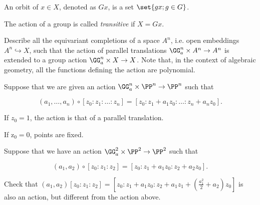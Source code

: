 \documentclass[11pt]{scrartcl}
\begin{document}
  \begin{definition}
    An orbit of $x\in X$, denoted as $Gx$, is a set
    $\set{gx; g\in G}$.
  \end{definition}

  The action of a group is called \textit{transitive} if $X = Gx$.

  \begin{problem*}
    \hfill
    
    Describe all the equivariant completions of a space $A^{n}$, i.e.
    open embeddings $A^{n} \hookrightarrow X$, such that the action of
    parallel translations $\GG_{a}^{n}\times A^{n} \to A^{n}$ is
    extended to a group action $\GG_{a}^{n}\times X \to X$. Note that,
    in the context of algebraic geometry, all the functions defining
    the action are polynomial.
  \end{problem*}

  \begin{example}

    Suppose that we are given an action
    $\GG_{a}^{n}\times \PP^{n} \to \PP^{n}$ such that
    
    \begin{equation*}
      (a_{1}, \dots, a_{n}) \circ [z_{0}:z_{1}:\dots:z_{n}] = [z_{0}: z_{1}+a_{1}z_{0}:\dots:z_{n}+a_{n}z_{0}].
    \end{equation*}

    If $z_{0} = 1$, the action is that of a parallel translation.

    If z$_{0} = 0$, points are fixed.
  \end{example}

  \begin{example}

    Suppose that we have an action
    $\GG_{a}^{2}\times \PP^{2} \to \PP^{2}$ such that

    \begin{equation*}
      (a_{1}, a_{2})\circ [z_{0}:z_{1}:z_{2}] = [z_{0}: z_{1}+a_{1}z_{0}:z_{2}+a_{2}z_{0}].
    \end{equation*}

    \begin{exercise}

      Check that
      $(a_{1}, a_{2})[z_{0}:z_{1}:z_{2}] =
      [z_{0}:z_{1}+a_{1}z_{0}:z_{2}+a_{1}z_{1}+(\frac{a_{1}^{2}}{2}+a_{2})z_{0}]$
      is also an action, but different from the action above.

    \end{exercise}


  \end{example}
\end{document}
